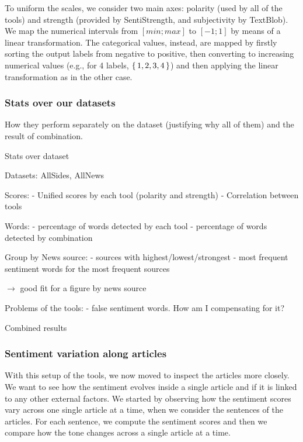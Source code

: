 To uniform the scales, we consider two main axes: polarity (used by all of the tools) and strength (provided by SentiStrength, and subjectivity by TextBlob). We map the numerical intervals from $[min;max]$ to $[-1;1]$ by means of a linear transformation. The categorical values, instead, are mapped by firstly sorting the output labels from negative to positive, then converting to increasing numerical values (e.g., for 4 labels, $\set{1,2,3,4}$) and then applying the linear transformation as in the other case.

\subsubsection{\statusred Stats over our datasets}

How they perform separately on the dataset (justifying why all of them) and the result of combination.


Stats over dataset


Datasets: AllSides, AllNews

Scores:
- Unified scores by each tool (polarity and strength)
- Correlation between tools

Words:
- percentage of words detected by each tool
- percentage of words detected by combination

Group by News source:
- sources with highest/lowest/strongest
- most frequent sentiment words for the most frequent sources

$\rightarrow$ good fit for a figure by news source

Problems of the tools: 
- false sentiment words. How am I compensating for it?

Combined results


\subsubsection{\statusorange Sentiment variation along articles}

With this setup of the tools, we now moved to inspect the articles more closely. We want to see how the sentiment evolves inside a single article and if it is linked to any other external factors.
We started by observing how the sentiment scores vary across one single article at a time, when we consider the sentences of the articles. For each sentence, we compute the sentiment scores and then we compare how the tone changes across a single article at a time.

